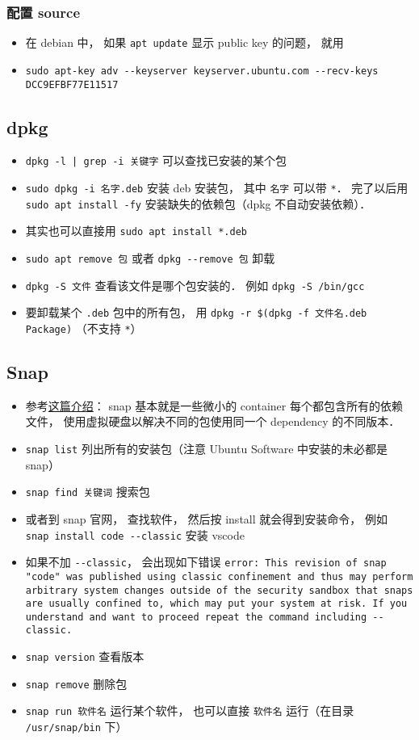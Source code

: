 \subsubsection{配置 source}
\begin{itemize}
\item 在 debian 中， 如果 \verb|apt update| 显示 public key 的问题， 就用
\item \verb|sudo apt-key adv --keyserver keyserver.ubuntu.com --recv-keys DCC9EFBF77E11517|
\end{itemize}


\subsection{dpkg}
\begin{itemize}
\item \verb`dpkg -l | grep -i 关键字` 可以查找已安装的某个包
\item \verb|sudo dpkg -i 名字.deb| 安装 deb 安装包， 其中 \verb|名字| 可以带 \verb|*|． 完了以后用 \verb|sudo apt install -fy| 安装缺失的依赖包（dpkg 不自动安装依赖）．
\item 其实也可以直接用 \verb|sudo apt install *.deb|
\item \verb|sudo apt remove 包| 或者 \verb|dpkg --remove 包| 卸载
\item \verb|dpkg -S 文件| 查看该文件是哪个包安装的． 例如 \verb|dpkg -S /bin/gcc|
\item 要卸载某个 \verb|.deb| 包中的所有包， 用 \verb|dpkg -r $(dpkg -f 文件名.deb Package)| （不支持 \verb|*|）
\end{itemize}

\subsection{Snap}
\begin{itemize}
\item 参考\href{https://www.howtogeek.com/660193/how-to-work-with-snap-packages-on-linux/}{这篇介绍}： snap 基本就是一些微小的 container 每个都包含所有的依赖文件， 使用虚拟硬盘以解决不同的包使用同一个 dependency 的不同版本．
\item \verb|snap list| 列出所有的安装包（注意 Ubuntu Software 中安装的未必都是 snap）
\item \verb|snap find 关键词| 搜索包
\item 或者到 snap 官网， 查找软件， 然后按 install 就会得到安装命令， 例如 \verb|snap install code --classic| 安装 vscode
\item 如果不加 \verb|--classic|， 会出现如下错误 \verb|error: This revision of snap "code" was published using classic confinement and thus may perform arbitrary system changes outside of the security sandbox that snaps are usually confined to, which may put your system at risk. If you understand and want to proceed repeat the command including --classic.|
\item \verb|snap version| 查看版本
\item \verb|snap remove| 删除包
\item \verb|snap run 软件名| 运行某个软件， 也可以直接 \verb|软件名| 运行（在目录 \verb|/usr/snap/bin| 下）
\end{itemize}
